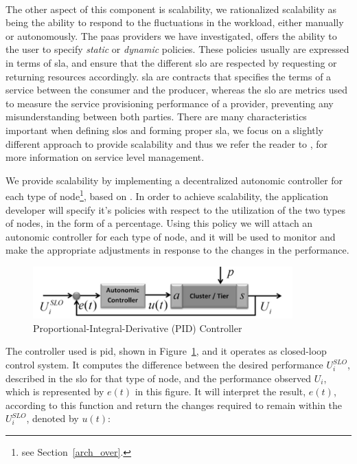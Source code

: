 \documentclass[12pt, titlepage]{uo_temp}
\begin{document}
     
     \\ The other aspect of this component is scalability, we rationalized scalability as
     being the ability to respond to the fluctuations in the workload, either manually or
     autonomously.  The \gls{paas} providers we have investigated, offers the ability to
     the user to specify \emph{static} or \emph{dynamic} policies. These policies usually
     are expressed in terms of \gls{sla}, and ensure that the different \gls{slo} are
     respected by requesting or returning resources accordingly. \gls{sla} are contracts
     that specifies the terms of a service between the consumer and the producer, whereas
     the \gls{slo} are metrics used to measure the service provisioning performance of a
     provider, preventing any misunderstanding between both parties. There are many
     characteristics important when defining \gls{slo}s and forming proper \gls{sla}, we
     focus on a slightly different approach to provide scalability and thus we refer the
     reader to \cite{keller2003wsla} \cite{sturm2000foundations}, for more information on
     service level management.

     We provide scalability by implementing a decentralized autonomic
     controller for each type of node\footnote{see Section~\ref{arch_over}.}, based on
     \cite{gergin2014decentralized}. In order to achieve scalability, the application
     developer will specify it's policies with respect to the utilization of the two types
     of nodes, in the form of a percentage. Using this policy we will attach an autonomic
     controller for each type of node, and it will be used to monitor and make the
     appropriate adjustments in response to the changes in the performance.

     \begin{figure}[h]
       \centering
       \includegraphics[width=100mm]{./images/self_optimization-PID.png}
       \caption{Proportional-Integral-Derivative (PID) Controller
         \cite{gergin2014decentralized}}
       \label{pid_fig}
     \end{figure}
     
     The controller used is \gls{pid}, shown in Figure~\ref{pid_fig}, and it operates as
     closed-loop control system. It computes the difference between the desired
     performance $U^{SLO}_i$, described in the \gls{slo} for that type of node, and the
     performance observed $U_i$, which is represented by $e(t)$ in this figure. It will
     interpret the result, $e(t)$, according to this function and return the changes
     required to remain within the $U^{SLO}_i$, denoted by $u(t)$:
\end{document}
